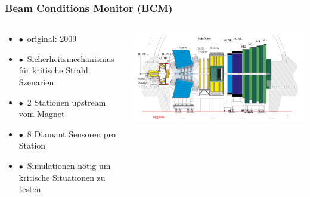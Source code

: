 \documentclass[aspectratio=1610, 12pt, xcolor=dvipsnames]{beamer}
\begin{document}
\begin{frame}\frametitle{Beam Conditions Monitor (BCM)}
  \begin{columns}
    \begin{column}[c]{0.48\textwidth}
      \begin{itemize}
        \item $\bullet$\, original: 2009 
        \item $\bullet$\, Sicherheitsmechanismus für kritische Strahl Szenarien
        \item $\bullet$\, 2 Stationen upstream vom Magnet
        \item $\bullet$\, 8 Diamant Sensoren pro Station
        \item $\bullet$\, Simulationen nötig um kritische Situationen zu testen
      \end{itemize}
    \end{column}
    \begin{column}[c]{0.48\textwidth}
      \includegraphics[width=\textwidth]{plots/bcm_full.png}
    \end{column}
  \end{columns}
\end{frame}
\end{document}
